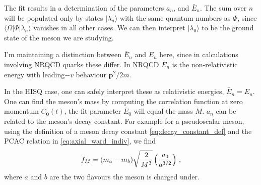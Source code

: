 The fit results in a determination of the parameters $a_n$, and $\bar{E}_n$. The sum over $n$ will be populated only by states $|\lambda_n\rangle$ with the same quantum numbers as $\Phi$, since $\langle\Omega | \Phi | \lambda_n \rangle$ vanishes in all other cases. We can then interpret $|\lambda_0\rangle$ to be the ground state of the meson we are studying. 

I'm maintaining a distinction between $\bar{E}_n$ and $E_n$ here, since in calculations involving NRQCD quarks these differ. In NRQCD $\bar{E}_n$ is the non-relativistic energy with leading$-v$ behaviour ${\textbf{p}}^2/2m$.

In the HISQ case, one can safely interpret these as relativistic energies, $\bar{E}_n=E_n$. One can find the meson's mass by computing the correlation function at zero momentum $C_{{\textbf{0}}}(t)$, the fit parameter $\bar{E}_0$ will equal the mass $M$. $a_n$ can be related to the meson's decay constant. For example for a pseudoscalar meson, using the definition of a meson decay constant \eqref{eq:decay_constant_def} and the PCAC relation in \eqref{eq:axial_ward_indiv}, we find
\begin{align}
  f_M = (m_a-m_b) \sqrt{2\over M^3} \left({a_0\over a^{3/2}}\right)\,,
  \label{eq:decayconstant_pseudoscalar}
\end{align}
where $a$ and $b$ are the two flavours the meson is charged under.

